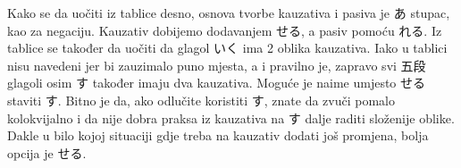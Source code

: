 	Kako se da uočiti iz tablice desno, osnova tvorbe kauzativa i pasiva je あ stupac, kao za negaciju. Kauzativ dobijemo dodavanjem せる, a pasiv pomoću れる. Iz tablice se također da uočiti da glagol いく ima 2 oblika kauzativa. Iako u tablici nisu navedeni jer bi zauzimalo puno mjesta, a i pravilno je, zapravo svi 五段 glagoli osim す također imaju dva kauzativa. Moguće je naime umjesto せる staviti す. Bitno je da, ako odlučite koristiti す, znate da zvuči pomalo kolokvijalno i da nije dobra praksa iz kauzativa na す dalje raditi složenije oblike. Dakle u bilo kojoj situaciji gdje treba na kauzativ dodati još promjena, bolja opcija je せる.
	
